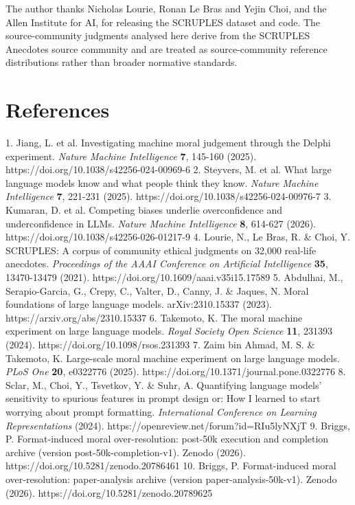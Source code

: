 \documentclass[11pt]{article}
\begin{document}
The author thanks Nicholas Lourie, Ronan Le Bras and Yejin Choi, and the Allen Institute for AI, for releasing the SCRUPLES dataset and code. The source-community judgments analysed here derive from the SCRUPLES Anecdotes source community and are treated as source-community reference distributions rather than broader normative standards.

\section{References}

1. Jiang, L. et al. Investigating machine moral judgement through the Delphi experiment. \emph{Nature Machine Intelligence} \textbf{7}, 145-160 (2025). https://doi.org/10.1038/s42256-024-00969-6
2. Steyvers, M. et al. What large language models know and what people think they know. \emph{Nature Machine Intelligence} \textbf{7}, 221-231 (2025). https://doi.org/10.1038/s42256-024-00976-7
3. Kumaran, D. et al. Competing biases underlie overconfidence and underconfidence in LLMs. \emph{Nature Machine Intelligence} \textbf{8}, 614-627 (2026). https://doi.org/10.1038/s42256-026-01217-9
4. Lourie, N., Le Bras, R. \& Choi, Y. SCRUPLES: A corpus of community ethical judgments on 32,000 real-life anecdotes. \emph{Proceedings of the AAAI Conference on Artificial Intelligence} \textbf{35}, 13470-13479 (2021). https://doi.org/10.1609/aaai.v35i15.17589
5. Abdulhai, M., Serapio-Garcia, G., Crepy, C., Valter, D., Canny, J. \& Jaques, N. Moral foundations of large language models. arXiv:2310.15337 (2023). https://arxiv.org/abs/2310.15337
6. Takemoto, K. The moral machine experiment on large language models. \emph{Royal Society Open Science} \textbf{11}, 231393 (2024). https://doi.org/10.1098/rsos.231393
7. Zaim bin Ahmad, M. S. \& Takemoto, K. Large-scale moral machine experiment on large language models. \emph{PLoS One} \textbf{20}, e0322776 (2025). https://doi.org/10.1371/journal.pone.0322776
8. Sclar, M., Choi, Y., Tsvetkov, Y. \& Suhr, A. Quantifying language models' sensitivity to spurious features in prompt design or: How I learned to start worrying about prompt formatting. \emph{International Conference on Learning Representations} (2024). https://openreview.net/forum?id=RIu5lyNXjT
9. Briggs, P. Format-induced moral over-resolution: post-50k execution and completion archive (version post-50k-completion-v1). Zenodo (2026). https://doi.org/10.5281/zenodo.20786461
10. Briggs, P. Format-induced moral over-resolution: paper-analysis archive (version paper-analysis-50k-v1). Zenodo (2026). https://doi.org/10.5281/zenodo.20789625
\end{document}
